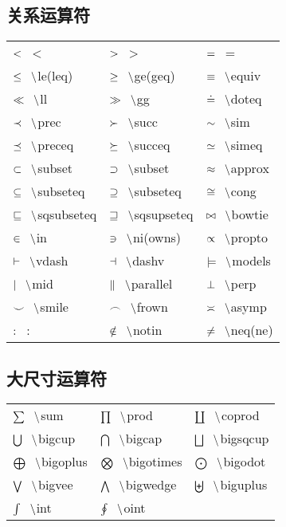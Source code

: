 \documentclass{ctexart}
\newcommand{\pair}[2]{${#1} \hspace{0.3cm} \backslash ${#2}}
\newcommand{\nbpair}[2]{${#1} \hspace{0.3cm} ${#2}} %
\begin{document}
\subsection{关系运算符}
\begin{tabular}{p{4.4cm}p{4.4cm}p{4.4cm}}
    \nbpair{<}{<} & \nbpair{>}{>} & \nbpair{=}{=} \\
    \pair{\le}{le(leq)} & \pair{\ge}{ge(geq)} & \pair{\equiv}{equiv} \\
    \pair{\ll}{ll} & \pair{\gg}{gg} & \pair{\doteq}{doteq} \\
    \pair{\prec}{prec} & \pair{\succ}{succ} & \pair{\sim}{sim} \\
    \pair{\preceq}{preceq} & \pair{\succeq}{succeq} & \pair{\simeq}{simeq} \\
    \pair{\subset}{subset} & \pair{\supset}{subset} & \pair{\approx}{approx} \\
    \pair{\subseteq}{subseteq} & \pair{\supseteq}{subseteq} & \pair{\cong}{cong} \\
    \pair{\sqsubseteq}{sqsubseteq} & \pair{\sqsupseteq}{sqsupseteq} & \pair{\bowtie}{bowtie} \\
    \pair{\in}{in} & \pair{\ni}{ni(owns)} & \pair{\propto}{propto} \\
    \pair{\vdash}{vdash} & \pair{\dashv}{dashv} & \pair{\models}{models} \\
    \pair{\mid}{mid} & \pair{\parallel}{parallel} & \pair{\perp}{perp} \\
    \pair{\smile}{smile} & \pair{\frown}{frown} & \pair{\asymp}{asymp} \\
    \nbpair{:}{:} & \pair{\notin}{notin} & \pair{\neq}{neq(ne)}\\
\end{tabular}

\subsection{大尺寸运算符}

\begin{tabular}{p{4.4cm}p{4.4cm}p{4.4cm}}
    \pair{\sum}{sum} & \pair{\prod}{prod} & \pair{\coprod}{coprod} \\
    \pair{\bigcup}{bigcup} & \pair{\bigcap}{bigcap} & \pair{\bigsqcup}{bigsqcup} \\
    \pair{\bigoplus}{bigoplus} & \pair{\bigotimes}{bigotimes} & \pair{\bigodot}{bigodot} \\
    \pair{\bigvee}{bigvee} & \pair{\bigwedge}{bigwedge} & \pair{\biguplus}{biguplus} \\
    \pair{\int}{int} &\pair{\oint}{oint} & \\
\end{tabular}
\end{document}
